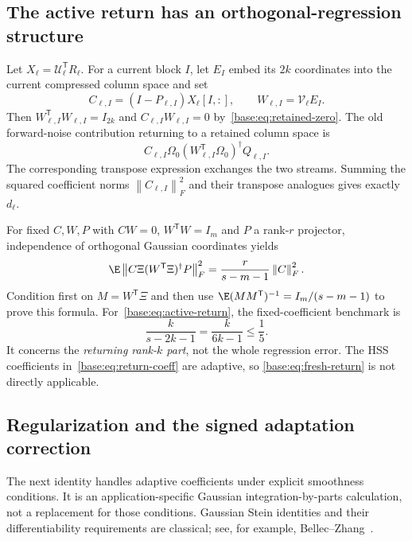 \documentclass[11pt,oneside,openany,a4paper]{book}
\numberwithin{equation}{chapter}
\theoremstyle{definition}
\theoremstyle{remark}
\newcommand{\T}{\mathsf T}\newcommand{\Id}{I}
\newcommand{\F}[1]{\left\lVert#1\right\rVert_F}
\newcommand{\UC}{\mathcal U}\newcommand{\VC}{\mathcal V}\newcommand{\err}{\mathcal E}
\begin{document}
\subsection{The active return has an orthogonal-regression structure}
Let $X_\ell=\UC_\ell^{\T}R_\ell$. For a current block $I$, let $E_I$ embed
its $2k$ coordinates into the current compressed column space and set
\begin{equation}\label{base:eq:return-coeff}
 C_{\ell,I}=(I-P_{\ell,I})X_\ell[I,:],\qquad
 W_{\ell,I}=\VC_\ell E_I.
\end{equation}
Then $W_{\ell,I}^{\T}W_{\ell,I}=I_{2k}$ and
$C_{\ell,I}W_{\ell,I}=0$ by~\eqref{base:eq:retained-zero}.
The old forward-noise contribution returning to a retained column space is
\begin{equation}\label{base:eq:active-return}
 C_{\ell,I}\Omega_0
       (W_{\ell,I}^{\T}\Omega_0)^\dagger Q_{\ell,I}.
\end{equation}
The corresponding transpose expression exchanges the two streams.
Summing the squared coefficient norms $\F{C_{\ell,I}}^2$ and their
transpose analogues gives exactly $d_\ell$.

For fixed $C,W,P$ with $CW=0$, $W^{\T}W=I_m$ and $P$ a rank-$r$ projector,
independence of orthogonal Gaussian coordinates yields
\begin{equation}\label{base:eq:fresh-return}
 \E\F{C\Xi(W^{\T}\Xi)^\dagger P}^2
 =\frac{r}{s-m-1}\F C^2.
\end{equation}
Condition first on $M=W^{\T}\Xi$ and then use
$\E(MM^{\T})^{-1}=I_m/(s-m-1)$ to prove this formula.
For~\eqref{base:eq:active-return}, the fixed-coefficient benchmark is
\begin{equation}\label{base:eq:return-fifth}
 \frac{k}{s-2k-1}=\frac{k}{6k-1}\le\frac15.
\end{equation}
It concerns the \emph{returning rank-$k$ part}, not the whole regression
error. The HSS coefficients in~\eqref{base:eq:return-coeff} are adaptive, so
\eqref{base:eq:fresh-return} is not directly applicable.

\subsection{Regularization and the signed adaptation correction}
The next identity handles adaptive coefficients under explicit smoothness
conditions. It is an application-specific Gaussian integration-by-parts
calculation, not a replacement for those conditions. Gaussian Stein
identities and their differentiability requirements are classical; see,
for example, Bellec--Zhang~\cite{BellecZhang}.
\end{document}
